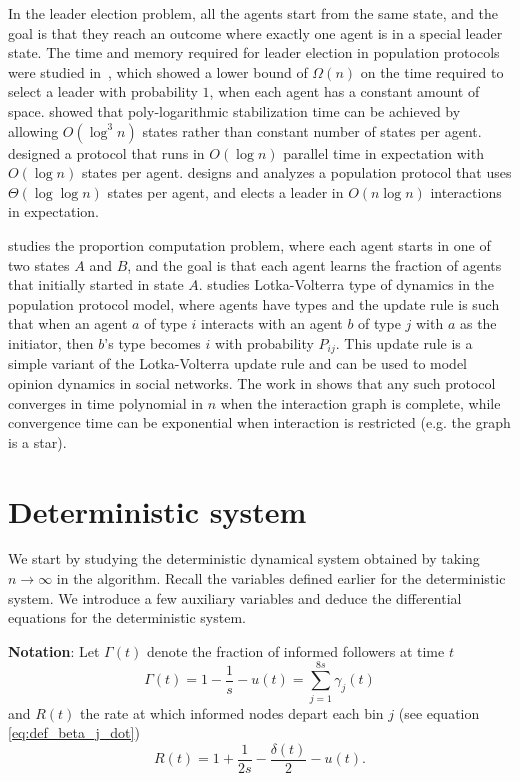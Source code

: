 \documentclass[a4paper,12pt]{article}
\begin{document}
In the leader election problem, all the agents start from the same state, and the goal is that they reach an outcome where exactly one agent is in a special leader state. The time and memory required for leader election in population protocols were studied in~\cite{DotyS18}, which showed a lower bound of $\Omega(n)$ on the time required to select a leader with probability $1$, when each agent has a constant amount of space. \cite{AlistarhG15} showed that  poly-logarithmic stabilization time can be achieved by allowing $O(\log^3{n})$ states rather than constant number of states per agent. \cite{SOIKM20} designed a protocol that runs in $O(\log{n})$ parallel time in expectation with $O(\log{n})$ states per agent. 
\cite{BerenbrinkGK20} designs and analyzes a population protocol that uses $\Theta(\log \log{n})$ states per agent, and elects a leader in $O(n \log{n})$ interactions in expectation. 

\cite{MSA19} studies the proportion computation problem, where each agent starts in one of two states $A$ and $B$, and the goal is that each agent learns the fraction of agents that initially started in state $A$.
\cite{CGKK+15} studies Lotka-Volterra type of dynamics in the population protocol model,
where agents have types and the update rule is such that when an agent $a$ of type  $i$ interacts with an agent $b$ of type $j$ with $ a$ as the initiator, then $b$’s type becomes $i$ with probability $P_{ij}$. This update rule is a simple variant of the Lotka-Volterra update rule and can be used to model opinion dynamics in social networks. The work in \cite{CGKK+15} shows that any such protocol converges in time polynomial in $n$ when the interaction graph is complete, while convergence time can be exponential when interaction is restricted (e.g. the graph is a star).


\section{Deterministic system} \label{sec:deterministic_system_def}

We start by studying the deterministic dynamical system obtained by taking $n \to \infty$ in the algorithm. Recall the variables defined earlier for the deterministic system. We introduce a few auxiliary variables and deduce the differential equations for the deterministic system.

\medskip 

\noindent \textbf{Notation}: Let $\Gamma(t)$ denote the fraction of informed followers at time $t$ $$\Gamma(t) = 1 - \frac{1}{s}- u(t) = \sum_{j=1}^{8s} \gamma_{j}(t)$$ and $R(t)$ the rate at which informed nodes depart each bin $j$ (see equation \ref{eq:def_beta_j_dot}) $$R(t) = 1 + \frac{1}{2s} - \frac{\delta(t)}{2} - u(t).$$
\end{document}
